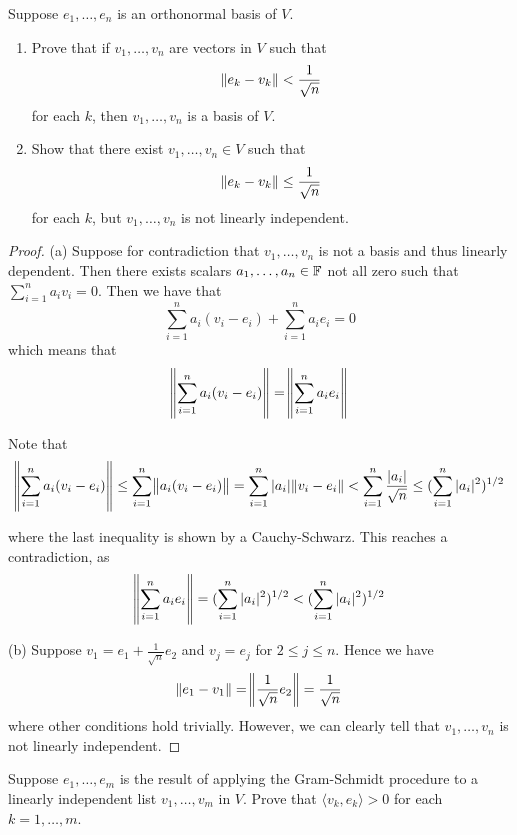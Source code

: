 \documentclass{extarticle}
\begin{document}
\begin{problem}{6}
    Suppose \(e_1, \ldots, e_n\) is an orthonormal basis of \(V\). 
    \begin{enumerate}[label=(\alph*)]
        \item Prove that if \(v_1, \ldots, v_n\) are vectors in \(V\) such that 
        \[\norm{e_k - v_k} < \frac{1}{\sqrt{n}}\]
        for each \(k\), then \(v_1, \ldots, v_n\) is a basis of \(V\).
        \item Show that there exist \(v_1, \ldots, v_n \in V\) such that 
        \[\norm{e_k - v_k} \leq \frac{1}{\sqrt{n}}\]
        for each \(k\), but \(v_1, \ldots, v_n\) is not linearly independent. 
    \end{enumerate}
\end{problem}

\begin{proof}
(a) Suppose for contradiction that \(v_1, \ldots, v_n\) is not a basis and thus linearly dependent. 
Then there exists scalars \(a_1, \ldots, a_n \in \mathbb{F}\) not all zero such that \(\sum_{i=1}^{n}a_iv_i = 0\). 
Then we have that 
\[\sum_{i=1}^{n} a_i (v_i - e_i) +  \sum_{i=1}^{n} a_i e_i = 0\]
which means that 
\[\norm{\sum_{i=1}^{n} a_i (v_i - e_i)} = \norm{\sum_{i=1}^{n} a_i e_i}\]

Note that 
\[\norm{\sum_{i=1}^{n} a_i (v_i - e_i)} \leq \sum_{i=1}^{n} \norm{a_i (v_i - e_i)} 
= \sum_{i=1}^{n} |a_i| \norm{v_i - e_i} < \sum_{i=1}^{n} \frac{|a_i|}{\sqrt{n}} \leq  (\sum_{i=1}^{n} |a_i|^2)^{1/2}\]

where the last inequality is shown by a Cauchy-Schwarz. This reaches a contradiction, as 
\[\norm{\sum_{i=1}^{n} a_i e_i} = (\sum_{i=1}^{n} |a_i|^2)^{1/2} < (\sum_{i=1}^{n} |a_i|^2)^{1/2}\]

(b) Suppose \(v_1 = e_1 + \frac{1}{\sqrt{n}}e_2\) and \(v_j = e_j\) for \(2 \leq j \leq n\). Hence we have 
\[\norm{e_1 - v_1} = \norm{\frac{1}{\sqrt{n}} e_2} = \frac{1}{\sqrt{n}}\]
where other conditions hold trivially. However, we can clearly tell that \(v_1, \ldots, v_n\) is not 
linearly independent. 
\end{proof}


\begin{problem}{9}
    Suppose \(e_1, \ldots, e_m\) is the result of applying the Gram-Schmidt procedure to a linearly 
    independent list \(v_1, \ldots, v_m\) in \(V\). Prove that \(\langle v_k,e_k \rangle > 0\) for 
    each \(k = 1, \ldots, m\).
\end{problem}
\end{document}
